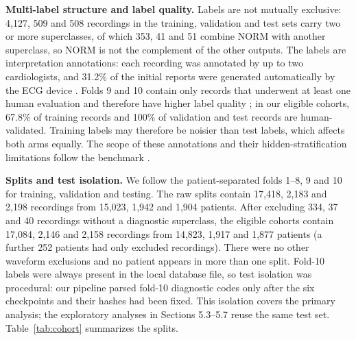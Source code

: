 \textbf{Multi-label structure and label quality.} Labels are not mutually exclusive: 4,127, 509 and 508 recordings in the training, validation and test sets carry two or more superclasses, of which 353, 41 and 51 combine NORM with another superclass, so NORM is not the complement of the other outputs. The labels are interpretation annotations: each recording was annotated by up to two cardiologists, and 31.2\% of the initial reports were generated automatically by the ECG device \citep{wagner2020ptbxl}. Folds 9 and 10 contain only records that underwent at least one human evaluation and therefore have higher label quality \citep{wagner2022ptbxl103}; in our eligible cohorts, 67.8\% of training records and 100\% of validation and test records are human-validated. Training labels may therefore be noisier than test labels, which affects both arms equally. The scope of these annotations and their hidden-stratification limitations follow the benchmark \citep{strodthoff2021benchmark}.

\textbf{Splits and test isolation.} We follow the patient-separated folds 1--8, 9 and 10 for training, validation and testing. The raw splits contain 17,418, 2,183 and 2,198 recordings from 15,023, 1,942 and 1,904 patients. After excluding 334, 37 and 40 recordings without a diagnostic superclass, the eligible cohorts contain 17,084, 2,146 and 2,158 recordings from 14,823, 1,917 and 1,877 patients (a further 252 patients had only excluded recordings). There were no other waveform exclusions and no patient appears in more than one split. Fold-10 labels were always present in the local database file, so test isolation was procedural: our pipeline parsed fold-10 diagnostic codes only after the six checkpoints and their hashes had been fixed. This isolation covers the primary analysis; the exploratory analyses in Sections 5.3--5.7 reuse the same test set. Table~\ref{tab:cohort} summarizes the splits.

